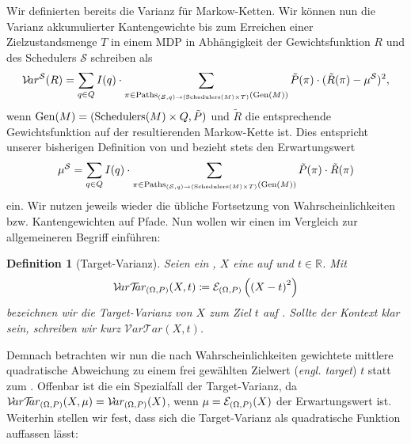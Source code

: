 \documentclass[a4paper]{article}
\newcommand{\mc}{Markow-Kette}
\newtheorem{definition}[satz]{Definition} %
\theoremstyle{nonumberplain}
\begin{document}
	Wir definierten bereits die Varianz für \mc{}n. Wir können nun die Varianz akkumulierter Kantengewichte bis zum Erreichen einer Zielzustandsmenge $T$ in einem MDP \mdpex{} in Abhängigkeit der Gewichtsfunktion $R$ und des Schedulers $\mathcal{S}$ schreiben als
	\[
	\mathcal{V}\!ar^{\mathcal{S}}(R) = \sum_{q \in Q}{I(q)} \cdot \sum_{\pi \in \mathrm{Paths}_{(\mathcal{S},q) \rightarrow (\mathrm{Schedulers}(M)\times T)}(\mathrm{Gen}(M))}{\tilde{P}(\pi) \cdot (\tilde{R}(\pi) - \mu^{\mathcal{S}})^2}\text{,}
	\]
	wenn $\mathrm{Gen}(M)=(\mathrm{Schedulers}(M)\times Q, \tilde{P})$ und $\tilde{R}$ die entsprechende Gewichtsfunktion auf der resultierenden \mc{} ist.
	Dies entspricht unserer bisherigen Definition von \var{} und bezieht stets den Erwartungswert
	\[
	\mu^{\mathcal{S}} = \sum_{q \in Q}{I(q)} \cdot \sum_{\pi \in \mathrm{Paths}_{(\mathcal{S},q) \rightarrow (\mathrm{Schedulers}(M)\times T)}(\mathrm{Gen}(M))}{\tilde{P}(\pi) \cdot \tilde{R}(\pi)}
	\]
	ein. Wir nutzen jeweils wieder die übliche Fortsetzung von Wahrscheinlichkeiten bzw. Kantengewichten auf Pfade. Nun wollen wir einen im Vergleich zur \var{} allgemeineren Begriff einführen:
	\newcommand{\vt}{Target-Varianz}
	\newcommand{\mvt}{\mathcal{V}\!ar \mathcal{T}\!\!ar}
	\newcommand{\vtex}{$\mvt(M_{\mathcal{S}},x)$}
	\begin{definition}[\vt]\label{def-vt}
		Seien \probspaceex{} ein \probspace{}, $X$ eine \rvar{} auf \probspaceex{} und $t \in \mathbb{R}$. Mit
		\begin{equation}
		\mvt_{\probspaceexraw{}}(X,t) \coloneqq \mathcal{E}_{\probspaceexraw{}}\left(\left(X - t\right)^{2}\right)
		\end{equation}
		bezeichnen wir die \vt{} von $X$ zum Ziel $t$ auf  \probspaceex{}. Sollte der Kontext \probspaceex{} klar sein, schreiben wir kurz $\mvt(X,t)$.
		
		
	\end{definition}
	
	Demnach betrachten wir nun die nach Wahrscheinlichkeiten gewichtete mittlere quadratische Abweichung zu einem frei gewählten Zielwert (\textit{engl. target}) $t$ statt zum \expect{}. Offenbar ist die \var{} ein Spezialfall der \vt{}, da $\mvt_{\probspaceexraw{}}(X,\mu) = \mvar_{\probspaceexraw{}}(X)$, wenn $\mu = \mathcal{E}_{(\Omega, P){}}(X)$ der Erwartungswert ist. Weiterhin stellen wir fest, dass sich die \vt{} als quadratische Funktion auffassen lässt:
	
\end{document}

